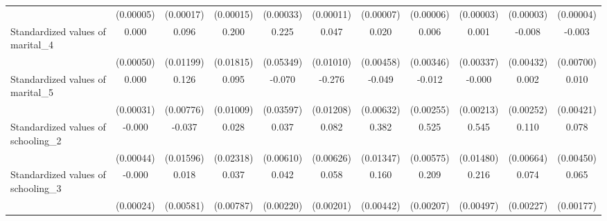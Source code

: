 {\begin{tabular}{l*{10}{c}}
                    &   (0.00005)         &   (0.00017)         &   (0.00015)         &   (0.00033)         &   (0.00011)         &   (0.00007)         &   (0.00006)         &   (0.00003)         &   (0.00003)         &   (0.00004)         \\
Standardized values of marital\_4&       0.000         &       0.096\sym{***}&       0.200\sym{***}&       0.225\sym{***}&       0.047\sym{***}&       0.020\sym{***}&       0.006         &       0.001         &      -0.008         &      -0.003         \\
                    &   (0.00050)         &   (0.01199)         &   (0.01815)         &   (0.05349)         &   (0.01010)         &   (0.00458)         &   (0.00346)         &   (0.00337)         &   (0.00432)         &   (0.00700)         \\
Standardized values of marital\_5&       0.000         &       0.126\sym{***}&       0.095\sym{***}&      -0.070         &      -0.276\sym{***}&      -0.049\sym{***}&      -0.012\sym{***}&      -0.000         &       0.002         &       0.010\sym{*}  \\
                    &   (0.00031)         &   (0.00776)         &   (0.01009)         &   (0.03597)         &   (0.01208)         &   (0.00632)         &   (0.00255)         &   (0.00213)         &   (0.00252)         &   (0.00421)         \\
Standardized values of schooling\_2&      -0.000         &      -0.037\sym{*}  &       0.028         &       0.037\sym{***}&       0.082\sym{***}&       0.382\sym{***}&       0.525\sym{***}&       0.545\sym{***}&       0.110\sym{***}&       0.078\sym{***}\\
                    &   (0.00044)         &   (0.01596)         &   (0.02318)         &   (0.00610)         &   (0.00626)         &   (0.01347)         &   (0.00575)         &   (0.01480)         &   (0.00664)         &   (0.00450)         \\
Standardized values of schooling\_3&      -0.000         &       0.018\sym{**} &       0.037\sym{***}&       0.042\sym{***}&       0.058\sym{***}&       0.160\sym{***}&       0.209\sym{***}&       0.216\sym{***}&       0.074\sym{***}&       0.065\sym{***}\\
                    &   (0.00024)         &   (0.00581)         &   (0.00787)         &   (0.00220)         &   (0.00201)         &   (0.00442)         &   (0.00207)         &   (0.00497)         &   (0.00227)         &   (0.00177)         \\

\end{tabular}}
